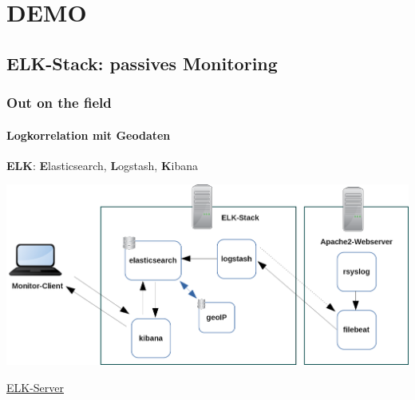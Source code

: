 \documentclass[10pt]{beamer} %
\begin{document}
\section{DEMO}
\frame{\tableofcontents[currentsection]}

\subsection{ELK-Stack: passives Monitoring}
\begin{frame}
\frametitle{Out on the field}
\framesubtitle{Logkorrelation mit Geodaten}

\hspace{1.5cm}\textbf{ELK}:\hspace{1.5cm} \textbf{E}lasticsearch, \textbf{L}ogstash, 
\textbf{K}ibana

\vspace{0.6cm}

\begin{center}
    \includegraphics[scale=0.25]{img/demo-elk.png}
\end{center}


\tiny{
  \href{https://seminar-server.dyndns.dk/app/kibana}{ELK-Server}}

\end{frame}
\end{document}
